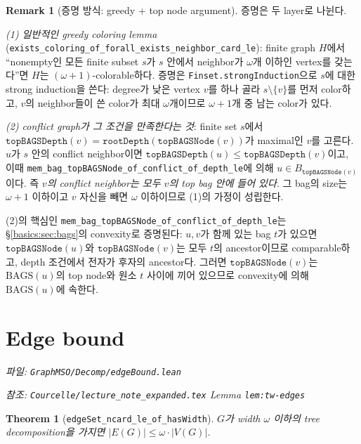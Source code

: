 \documentclass[11pt]{article}
\theoremstyle{definition}
\newtheorem{remark}[definition]{Remark}
\theoremstyle{plain}
\newtheorem{theorem}[definition]{Theorem}
\newcommand{\lean}[1]{\texttt{#1}}
\newcommand{\leanfile}[1]{\texttt{#1}}
\begin{document}
\begin{remark}[증명 방식: greedy + top node argument]
\label{basics:rem:greedyproof}
증명은 두 layer로 나뉜다.

\emph{(1) 일반적인 greedy coloring lemma}
(\lean{exists\_coloring\_of\_forall\_exists\_neighbor\_card\_le}):
finite graph $H$에서 ``nonempty인 모든 finite subset $s$가 $s$ 안에서
neighbor가 $\omega$개 이하인 vertex를 갖는다''면 $H$는
$(\omega+1)$-colorable하다. 증명은 \lean{Finset.strongInduction}으로 $s$에 대한
strong induction을 쓴다: degree가 낮은 vertex $v$를 하나 골라
$s \setminus \{v\}$를 먼저 color하고, $v$의 neighbor들이 쓴 color가 최대
$\omega$개이므로 $\omega+1$개 중 남는 color가 있다.

\emph{(2) conflict graph가 그 조건을 만족한다는 것}: finite set $s$에서
$\lean{topBAGSDepth}(v) = \lean{rootDepth}(\lean{topBAGSNode}(v))$가 maximal인
$v$를 고른다. $u$가 $s$ 안의 conflict neighbor이면
$\lean{topBAGSDepth}(u) \le \lean{topBAGSDepth}(v)$이고, 이때
\lean{mem\_bag\_topBAGSNode\_of\_conflict\_of\_depth\_le}에 의해
$u \in B_{\lean{topBAGSNode}(v)}$이다. 즉 \emph{$v$의 conflict neighbor는 모두
$v$의 top bag 안에 들어 있다}. 그 bag의 size는 $\omega+1$ 이하이고 $v$ 자신을
빼면 $\omega$ 이하이므로 (1)의 가정이 성립한다.

(2)의 핵심인 \lean{mem\_bag\_topBAGSNode\_of\_conflict\_of\_depth\_le}는
\S\ref{basics:sec:bags}의 convexity로 증명된다: $u, v$가 함께 있는 bag $t$가
있으면 $\lean{topBAGSNode}(u)$와 $\lean{topBAGSNode}(v)$는 모두 $t$의
ancestor이므로 comparable하고, depth 조건에서 전자가 후자의 ancestor다. 그러면
$\lean{topBAGSNode}(v)$는 $\mathrm{BAGS}(u)$의 top node와 원소 $t$ 사이에
끼어 있으므로 convexity에 의해 $\mathrm{BAGS}(u)$에 속한다.
\end{remark}

\section{Edge bound}
\label{basics:sec:edgebound}

\emph{파일: \leanfile{GraphMSO/Decomp/edgeBound.lean}}

\emph{참조: \leanfile{Courcelle/lecture\_note\_expanded.tex} Lemma
\lean{lem:tw-edges}}

\begin{theorem}[\lean{edgeSet\_ncard\_le\_of\_hasWidth}]
\label{basics:thm:edgebound}
$G$가 width $\omega$ 이하의 tree decomposition을 가지면
$|E(G)| \le \omega \cdot |V(G)|$.
\end{theorem}
\end{document}
